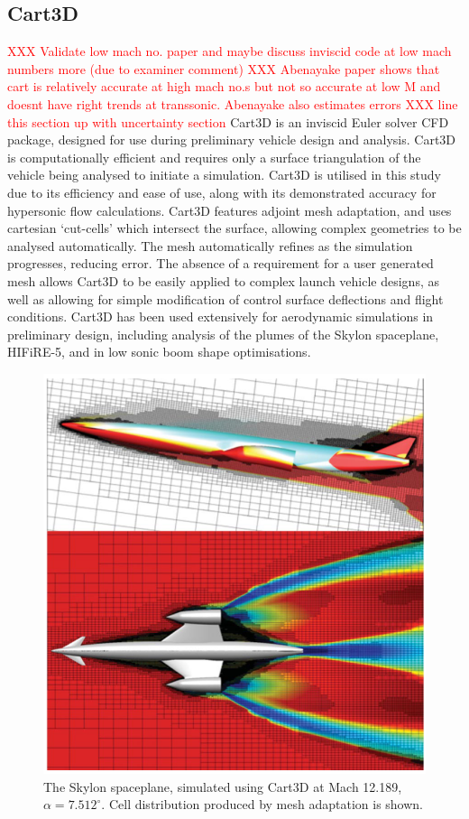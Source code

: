 \subsection{Cart3D}\label{sec:Cart3d}
\textcolor{red}{XXX Validate low mach no. paper and maybe discuss inviscid code at low mach numbers more (due to examiner comment)}
\textcolor{red}{XXX Abenayake paper shows that cart is relatively accurate at high mach no.s but not so accurate at low M and doesnt have right trends at transsonic. Abenayake also estimates errors}
\textcolor{red}{XXX line this section up with uncertainty section}
Cart3D is an inviscid Euler solver CFD package, designed for use during preliminary vehicle design and analysis\cite{Almosnino2016}. Cart3D is computationally efficient and requires only a surface triangulation of the vehicle being analysed to initiate a simulation. Cart3D is utilised in this study due to its efficiency and ease of use, along with its demonstrated accuracy for hypersonic flow calculations\cite{Sagerman2017,Abeynayake,Aftosmis2011,Almosnino2016a}. Cart3D features adjoint mesh adaptation, and uses cartesian `cut-cells' which intersect the surface, allowing complex geometries to be analysed automatically. The mesh automatically refines as the simulation progresses, reducing error. The absence of a requirement for a user generated mesh allows Cart3D to be easily applied to complex launch vehicle designs, as well as allowing for simple modification of control surface deflections and flight conditions. 
Cart3D has been used extensively for aerodynamic simulations in preliminary design, including analysis of the plumes of the Skylon spaceplane\cite{Mehta2016}, HIFiRE-5\cite{Kimmel2010}, and in low sonic boom shape optimisations\cite{Aftosmis2011}. 
\begin{figure}[ht]
\centering
\includegraphics[width=0.6\linewidth]{figures/2_literature-review/Skylon-Cart3D}
\caption{The Skylon spaceplane, simulated using Cart3D at Mach 12.189, $\alpha=7.512^\circ$\cite{Mehta2016}. Cell distribution produced by mesh adaptation is shown.}
\label{fig:Skylon-Cart3D}
\end{figure}
